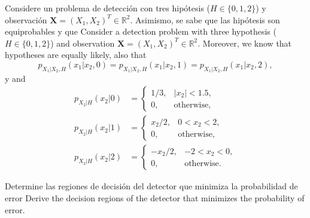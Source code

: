 \question

\ifspanish
Considere un problema de detección con tres hipótesis ($H \in\{0,1,2\}$) y observación $\mathbf{X} = (X_1, X_2)^T \in \mathbb{R}^2$. Asimismo, se sabe que las hipótesis son equiprobables y que
\else
Consider a detection problem with three hypothesis ($H \in\{0,1,2\}$) and observation $\mathbf{X} = (X_1, X_2)^T \in \mathbb{R}^2$. Moreover, we know that hypotheses are equally likely, also that
\fi
\begin{equation*}
p_{X_1|X_2,H}(x_1|x_2,0) = p_{X_1|X_2,H}(x_1|x_2,1) = p_{X_1|X_2,H}(x_1|x_2,2),
\end{equation*}
\ifspanish y \else and \fi
\begin{align*}
  p_{X_2|H}(x_2|0) &= \begin{cases} 1/3, & |x_2| < 1.5, \\ 0, & \text{otherwise}, \end{cases} \\
  p_{X_2|H}(x_2|1) &= \begin{cases} x_2/2, & 0 < x_2 < 2, \\ 0, & \text{otherwise}, \end{cases}\\
  p_{X_2|H}(x_2|2) &= \begin{cases} -x_2/2, & -2 < x_2 < 0, \\ 0, & \text{otherwise}. \end{cases}
\end{align*}

\ifspanish Determine las regiones de decisión del detector que minimiza la probabilidad de error
\else Derive the decision regions of the detector that minimizes the probability of error.
\fi

